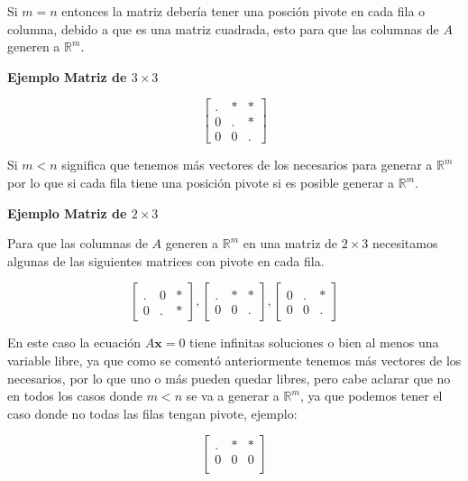 \documentclass{article}
\begin{document}
Si $m = n$ entonces la matriz debería tener una posción pivote en cada fila o columna, debido a que es una matriz cuadrada, esto para que las columnas de $A$ generen a $\mathbb{R}^m$.

\begin{large}
    \textbf{Ejemplo Matriz de $3 \times 3$}
\end{large}

$$\begin{bmatrix}
    . & * & *\\
    0 & . & *\\
    0 & 0 & .
\end{bmatrix}$$


Si $m < n$ significa que tenemos más vectores de los necesarios para generar a $\mathbb{R}^m$ por lo que si cada fila tiene una posición pivote si es posible generar a $\mathbb{R}^m$. 

\begin{large}
    \textbf{Ejemplo Matriz de $2 \times 3$}
\end{large}

Para que las columnas de $A$ generen a $\mathbb{R}^m$ en una matriz de $2 \times 3$ necesitamos algunas de las siguientes matrices con pivote en cada fila.

\begin{equation*}
    \begin{bmatrix}
        . & 0 & * \\
        0 & . & *
    \end{bmatrix}, 
    \begin{bmatrix}
        . & * & * \\
        0 & 0 & .
    \end{bmatrix},
    \begin{bmatrix}
        0 & . & * \\
        0 & 0 & .
    \end{bmatrix}
\end{equation*}

En este caso la ecuación $A\mathbf{x} = 0$ tiene infinitas soluciones o bien al menos una variable libre, ya que como se comentó anteriormente tenemos más vectores de los necesarios, por lo que uno o más pueden quedar libres, pero cabe aclarar que no en todos los casos donde $m < n$ se va a generar a $\mathbb{R}^m$, ya que podemos tener el caso donde no todas las filas tengan pivote, ejemplo: 

$$\begin{bmatrix}
    . & * & * \\
    0 & 0 & 0 \\ 
\end{bmatrix}$$
\end{document}
